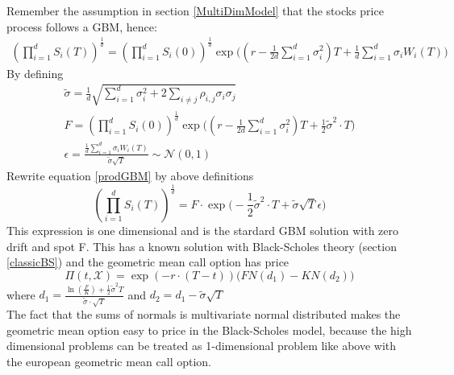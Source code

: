Remember the assumption in section \ref{MultiDimModel} that the stocks price process follows a GBM, hence:
\begin{equation}\label{prodGBM}
\begin{split}
(\prod_{i=1}^{d} S_i(T))^{\frac{1}{d}} = (\prod_{i=1}^{d} S_i(0))^{\frac{1}{d}} \exp\bigg((r-\frac{1}{2d}\sum_{i=1}^{d}\sigma_i^2)T + \frac{1}{d} \sum_{i=1}^{d} \sigma_i W_i(T) \bigg)
\end{split}
\end{equation}
By defining
\begin{align}
\tilde{\sigma} = \frac{1}{d} \sqrt{\sum_{i=1}^{d} \sigma_i^2 + 2 \sum_{i\neq j} \rho_{i,j} \sigma_i \sigma_j}\\
F=(\prod_{i=1}^{d} S_i(0))^{\frac{1}{d}} \exp\bigg((r-\frac{1}{2d}\sum_{i=1}^{d}\sigma_i^2)T + \frac{1}{2} \tilde{\sigma}^2 \cdot T \bigg)\\
\epsilon = \frac{\frac{1}{d} \sum_{i=1}^{d} \sigma_i W_i(T)}{\tilde{\sigma} \sqrt{T}} \sim \mathcal{N}(0,1)
\end{align}
Rewrite equation \eqref{prodGBM} by above definitions
$$(\prod_{i=1}^{d} S_i(T))^{\frac{1}{d}} = F \cdot \exp\bigg( -\frac{1}{2} \tilde{\sigma}^2 \cdot T + \tilde{\sigma} \sqrt{T} \epsilon \bigg)$$
This expression is one dimensional and is the stardard GBM solution with zero drift and spot F. This has a known solution with Black-Scholes theory (section \ref{classicBS}) and the geometric mean call option has price
\begin{equation*}
\Pi(t,\mathcal{X})=\exp(-r \cdot (T-t))\bigg(F N(d_1) - K N(d_2) \bigg)
\end{equation*}
where $d_1=\frac{\ln(\frac{F}{K}) + \frac{1}{2} \tilde{\sigma}^2 T}{\tilde{\sigma} \cdot \sqrt{T}}$ and $d_2=d_1-\tilde{\sigma} \sqrt{T}$\\

The fact that the sums of normals is multivariate normal distributed makes the geometric mean option easy to price in the Black-Scholes model, because the high dimensional problems can be treated as 1-dimensional problem like above with the european geometric mean call option.

